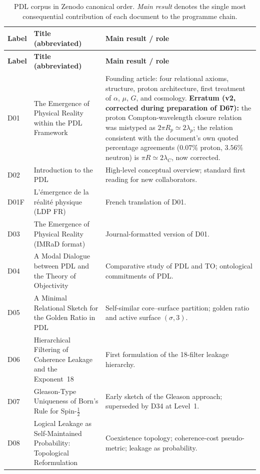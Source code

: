 \documentclass[11pt,a4paper]{article}
\theoremstyle{plain}
\theoremstyle{definition}
\theoremstyle{remark}
\begin{document}
\begin{longtable}{L{1.3cm}L{3.8cm}L{8.0cm}}
\caption{PDL corpus in Zenodo canonical order. \emph{Main result} denotes the single most consequential contribution of each document to the programme chain.}
\label{tab:documents}\\
\toprule
\textbf{Label} & \textbf{Title (abbreviated)} & \textbf{Main result / role}\\
\midrule
\endfirsthead
\toprule
\textbf{Label} & \textbf{Title (abbreviated)} & \textbf{Main result / role}\\
\midrule
\endhead
\bottomrule
\endfoot
D01 & The Emergence of Physical Reality within the PDL Framework~\cite{D01} & Founding article: four relational axioms, structure, proton architecture, first treatment of $\alpha$, $\mu$, $G$, and cosmology. \textbf{Erratum (v2, corrected during preparation of D67):} the proton Compton-wavelength closure relation was mistyped as $2\pi R_p\simeq2\lambda_p$; the relation consistent with the document's own quoted percentage agreements ($0.07\%$ proton, $3.56\%$ neutron) is $\pi R\simeq2\lambda_C$, now corrected.\\[0.3em]
D02 & Introduction to the PDL~\cite{D02} & High-level conceptual overview; standard first reading for new collaborators.\\[0.3em]
D01F & L'\'emergence de la r\'ealit\'e physique (LDP FR)~\cite{D01F} & French translation of D01.\\[0.3em]
D03 & The Emergence of Physical Reality (IMRaD format)~\cite{D03} & Journal-formatted version of D01.\\[0.3em]
D04 & A Modal Dialogue between PDL and the Theory of Objectivity~\cite{D04} & Comparative study of PDL and TO; ontological commitments of PDL.\\[0.3em]
D05 & A Minimal Relational Sketch for the Golden Ratio in PDL~\cite{D05} & Self-similar core--surface partition; golden ratio and active surface $(\sigma,3)$.\\[0.3em]
D06 & Hierarchical Filtering of Coherence Leakage and the Exponent~18~\cite{D06} & First formulation of the 18-filter leakage hierarchy.\\[0.3em]
D07 & Gleason-Type Uniqueness of Born's Rule for Spin-$\tfrac{1}{2}$~\cite{D07} & Early sketch of the Gleason approach; superseded by D34 at Level~1.\\[0.3em]
D08 & Logical Leakage as Self-Maintained Probability: Topological Reformulation~\cite{D08} & Coexistence topology; coherence-cost pseudo-metric; leakage as probability.\\[0.3em]

\end{longtable}
\end{document}
